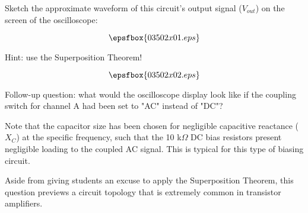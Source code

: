 

Sketch the approximate waveform of this circuit's output signal ($V_{out}$) on the screen of the oscilloscope:

$$\epsfbox{03502x01.eps}$$

Hint: use the Superposition Theorem!

\vskip 10pt







$$\epsfbox{03502x02.eps}$$

\vskip 10pt

Follow-up question: what would the oscilloscope display look like if the coupling switch for channel A had been set to "AC" instead of "DC"?







Note that the capacitor size has been chosen for negligible capacitive reactance ($X_C$) at the specific frequency, such that the 10 k$\Omega$ DC bias resistors present negligible loading to the coupled AC signal.  This is typical for this type of biasing circuit.

Aside from giving students an excuse to apply the Superposition Theorem, this question previews a circuit topology that is extremely common in transistor amplifiers.




